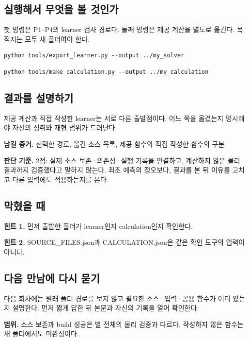 \documentclass[
  10pt,
  a4paper,
]{article}
\begin{document}
\newpage

\subsection{실행해서 무엇을 볼
것인가}\label{uxc2e4uxd589uxd574uxc11c-uxbb34uxc5c7uxc744-uxbcfc-uxac83uxc778uxac00}

첫 명령은 P1--P4의 learner 검사 경로다. 둘째 명령은 제공 계산을 별도로
옮긴다. 목적지는 모두 새 폴더여야 한다.

\begin{verbatim}
python tools/export_learner.py --output ../my_solver
\end{verbatim}

\begin{verbatim}
python tools/make_calculation.py --output ../my_calculation
\end{verbatim}

\subsection{결과를
설명하기}\label{uxacb0uxacfcuxb97c-uxc124uxba85uxd558uxae30}

제공 계산과 직접 작성한 learner는 서로 다른 출발점이다. 어느 쪽을
옮겼는지 명시해야 자신의 성취와 재현 범위가 드러난다.

\textbf{남길 증거.} 선택한 경로, 옮긴 소스 목록, 제공 함수와 직접 작성한
함수의 구분

\textbf{판단 기준.} 2점: 실제 소스 보존·의존성·실행 기록을 연결하고,
계산하지 않은 물리 결과까지 검증했다고 말하지 않는다. 최초 예측의
정오보다, 결과를 본 뒤 이유를 고치고 다른 입력에도 적용하는지를 본다.

\subsection{막혔을 때}\label{uxb9c9uxd614uxc744-uxb54c}

\textbf{힌트 1.} 먼저 출발한 폴더가 learner인지 calculation인지
확인한다.

\textbf{힌트 2.} SOURCE\_FILES.json과 CALCULATION.json은 같은 확인
도구의 입력이 아니다.

\subsection{다음 만남에 다시
묻기}\label{uxb2e4uxc74c-uxb9ccuxb0a8uxc5d0-uxb2e4uxc2dc-uxbb3buxae30}

다음 회차에는 원래 폴더 경로를 보지 않고 필요한 소스·입력·공용 함수가
어디 있는지 설명한다. 먼저 짧게 답한 뒤 본문과 자신의 기록을 열어
확인한다.

\textbf{범위.} 소스 보존과 build 성공은 별 전체의 물리 검증과 다르다.
작성하지 않은 함수는 새 폴더에서도 미완성이다.
\end{document}
